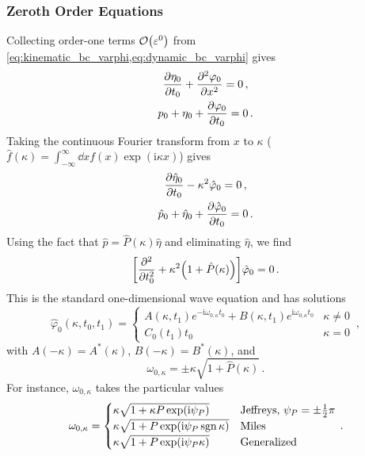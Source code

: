 \documentclass{jfm}
\let\Oldsubsubsection\subsubsection
\renewcommand{\subsubsection}{\FloatBarrier\Oldsubsubsection}
\newcommand{\GenPk}{\hat{P}(\kappa)}
\DeclareMathOperator{\sgn}{sgn}
\newcommand{\im}{\mathrm{i}}
\renewcommand*{\epsilon}{\varepsilon}
\begin{document}
\subsubsection{Zeroth Order Equations}
Collecting order-one terms $\order{\epsilon^0}$ from
\cref{eq:kinematic_bc_varphi,eq:dynamic_bc_varphi} gives
\begin{gather}
  \pdv{\eta_0}{t_0} + \pdv[2]{\varphi_0}{x} = 0 \,, \\
  p_0 + \eta_0 + \pdv{\varphi_0}{t_0} = 0 \,.
\end{gather}
Taking the continuous Fourier transform from $x$ to $\kappa$
($\hat{f}(\kappa) = \int_{-\infty}^{\infty} \dd{x} f(x) \exp(\im \kappa
x)$) gives
\begin{gather}
  \pdv{\hat{\eta}_0}{t_0} - \kappa^2  \hat{\varphi}_0 = 0 \,, \\
  \hat{p}_0 + \hat{\eta}_0 + \pdv{\hat{\varphi}_0}{t_0} = 0 \,.
\end{gather}
Using the fact that $\hat{p} = \GenPk \hat{\eta}$ and eliminating
$\hat{\eta}$, we find
\begin{equation}
  \bqty{\pdv[2]{t_0} + \kappa^2 \pqty{1+\GenPk}} \hat{\varphi}_0 = 0 \,.
\end{equation}
This is the standard one-dimensional wave equation and has solutions
\begin{equation}
  \hat{\varphi}_0(\kappa,t_0,t_1) =
  \begin{cases}
    A(\kappa,t_1) e^{-\im \omega_{0,\kappa} t_0} + B(\kappa,t_1)
      e^{\im \omega_{0,\kappa} t_0} & \kappa \neq 0 \\
    C_0(t_1) t_0 & \kappa = 0
  \end{cases} \,,
\end{equation}
with
$A(-\kappa) = A^*(\kappa)$, $B(-\kappa) = B^*(\kappa)$, and
\begin{equation}
  \omega_{0,\kappa} = \pm \kappa \sqrt{1 + \GenPk} \,.
\end{equation}
For instance, $\omega_{0,\kappa}$ takes the particular values
\[
  \omega_{0,\kappa} = \begin{cases}
    \kappa \sqrt{1 + \kappa P \exp(\im \psi_P)} & \text{Jeffreys, } \psi_P
      = \pm \thalf \pi \\
    \kappa \sqrt{1 + P \exp(\im \psi_P \sgn{\kappa})} & \text{Miles} \\
    \kappa \sqrt{1 + P \exp(\im \psi_P \kappa)} & \text{Generalized}
  \end{cases}
  \,.
\]
\end{document}
